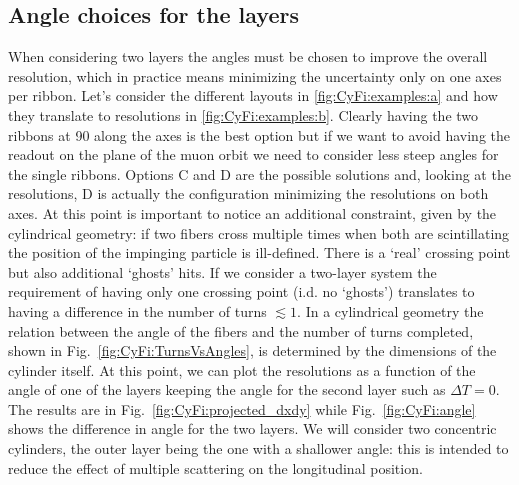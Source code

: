 \begin{refsection}
    \subsection{Angle choices for the layers}
        When considering two layers the angles must be chosen to improve the overall resolution, which in practice means minimizing the uncertainty only on one axes per ribbon.
        Let's consider the different layouts in \ref{fig:CyFi:examples:a} and how they translate to resolutions in \ref{fig:CyFi:examples:b}.
        Clearly having the two ribbons at \SI{90}{\deg} along the axes is the best option but if we want to avoid having the readout on the plane of the muon orbit we need to consider less steep angles for the single ribbons.
        Options C and D are the possible solutions and, looking at the resolutions, D is actually the configuration minimizing the resolutions on both axes. 
        At this point is important to notice an additional constraint, given by the cylindrical geometry: if two fibers cross multiple times when both are scintillating the position of the impinging particle is ill-defined. There is a `real' crossing point but also additional `ghosts' hits.
        If we consider a two-layer system the requirement of having only one crossing point (i.d. no `ghosts') translates to having a difference in the number of turns $\lesssim1$. 
        In a cylindrical geometry the relation between the angle of the fibers and the number of turns completed, shown in Fig.~\ref{fig:CyFi:TurnsVsAngles}, is determined by the dimensions of the cylinder itself.
        At this point, we can plot the resolutions as a function of the angle of one of the layers keeping the angle for the second layer such as $\Delta T=0$. The results are in Fig.~\ref{fig:CyFi:projected_dxdy} while Fig.~\ref{fig:CyFi:angle} shows the difference in angle for the two layers.
        We will consider two concentric cylinders, the outer layer being the one with a shallower angle: this is intended to reduce the effect of multiple scattering on the longitudinal position.
        \begin{figure}
\end{figure}
\end{refsection}
